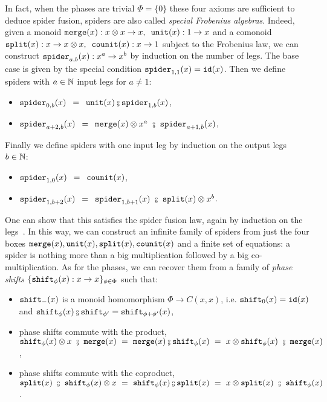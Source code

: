In fact, when the phases are trivial $\Phi = \{ 0 \}$ these four axioms are sufficient to deduce spider fusion, spiders are also called \emph{special Frobenius algebras}.
Indeed, given a monoid $\mathtt{merge}(x) : x \otimes x \to x, \enspace \mathtt{unit}(x) : 1 \to x$ and a comonoid $\mathtt{split}(x) : x \to x \otimes x, \enspace \mathtt{counit}(x) : x \to 1$ subject to the Frobenius law, we can construct $\mathtt{spider}_{a, b}(x) : x^a \to x^b$ by induction on the number of legs.
The base case is given by the special condition $\mathtt{spider}_{1, 1}(x) = \mathtt{id}(x)$.
Then we define spiders with $a \in \mathbb{N}$ input legs for $a \neq 1$:
\begin{itemize}
\item $\spider_{0, b}(x) \s = \s \unit(x) \fcmp \spider_{1, b}(x)$,
\item $\spider_{a + 2, b}(x) \s = \s \merge(x) \otimes x^a \ \fcmp \ \spider_{a + 1, b}(x)$,
\end{itemize}
\begin{center}
\hfill
{}
\end{center}
Finally we define spiders with one input leg by induction on the output legs $b \in \mathbb{N}$:
\begin{itemize}
\item $\mathtt{spider}_{1, 0}(x) \enspace = \enspace \mathtt{counit}(x)$,
\item $\spider_{1, b + 2}(x) \s = \s \spider_{1, b + 1}(x) \ \fcmp \ \ttsplit(x) \otimes x^b$.
\end{itemize}
One can show that this satisfies the spider fusion law, again by induction on the legs~\cite[Lemma 5.20]{HeunenVicary19a}.
In this way, we can construct an infinite family of spiders from just the four boxes $\mathtt{merge}(x), \mathtt{unit}(x), \mathtt{split}(x), \mathtt{counit}(x)$ and a finite set of equations: a spider is nothing more than a big multiplication followed by a big co-multiplication.
As for the phases, we can recover them from a family of \emph{phase shifts} $\{ \mathtt{shift}_\phi(x) : x \to x \}_{\phi \in \Phi}$ such that:
\begin{itemize}
\item $\mathtt{shift}_-(x)$ is a monoid homomorphism $\Phi \to C(x, x)$, i.e. $\mathtt{shift}_0(x) = \mathtt{id}(x)$ and $\shift_{\phi}(x) \fcmp \shift_{\phi'} = \shift_{\phi + \phi'}(x)$,
\item phase shifts commute with the product, $\shift_\phi(x) \otimes x \ \fcmp \ \merge(x)
\ = \ \merge(x) \fcmp \shift_\phi(x)
\ = \ x \otimes \shift_\phi(x) \ \fcmp \ \merge(x)$,
\item phase shifts commute with the coproduct, $\ttsplit(x) \ \fcmp \ \shift_\phi(x) \otimes x
\ = \ \shift_\phi(x) \fcmp \ttsplit(x)
\ = \ x \otimes \ttsplit(x) \ \fcmp \ \shift_\phi(x)$.
\end{itemize}
